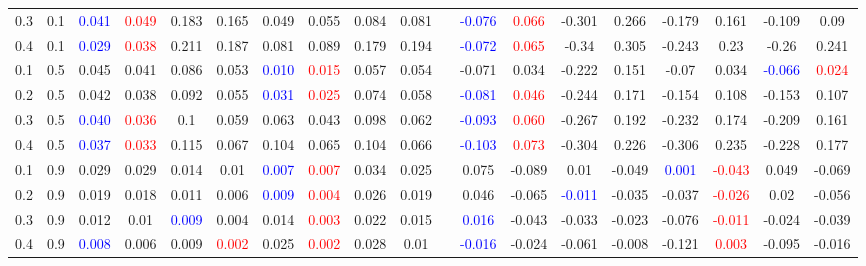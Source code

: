 \documentclass[specialist,
substylefile = spbu_report.rtx,
subf,href,colorlinks=true, 12pt]{disser}
\theoremstyle{definition}
\begin{document}
\begin{table}
{\begin{tabular}{m{1cm}m{1cm}ccccccccm{0.2cm}cccccccc}
			0.3 & 0.1 & \textcolor{blue}{0.041} & \textcolor{red}{0.049} & 0.183 & 0.165 & 0.049 & 0.055 & 0.084 & 0.081 & & \textcolor{blue}{-0.076} & \textcolor{red}{0.066} & -0.301 & 0.266 & -0.179 & 0.161 & -0.109 & 0.09 \\ 
			0.4 & 0.1 & \textcolor{blue}{0.029} & \textcolor{red}{0.038} & 0.211 & 0.187 & 0.081 & 0.089 & 0.179 & 0.194 & & \textcolor{blue}{-0.072} & \textcolor{red}{0.065} & -0.34 & 0.305 & -0.243 & 0.23 & -0.26 & 0.241 \\ 
			\hline
			0.1 & 0.5 & 0.045 & 0.041 & 0.086 & 0.053 & \textcolor{blue}{0.010} & \textcolor{red}{0.015} & 0.057 & 0.054 & & -0.071 & 0.034 & -0.222 & 0.151 & -0.07 & 0.034 & \textcolor{blue}{-0.066} & \textcolor{red}{0.024} \\ 
			0.2 & 0.5 & 0.042 & 0.038 & 0.092 & 0.055 & \textcolor{blue}{0.031} & \textcolor{red}{0.025} & 0.074 & 0.058 & & \textcolor{blue}{-0.081} & \textcolor{red}{0.046} & -0.244 & 0.171 & -0.154 & 0.108 & -0.153 & 0.107 \\ 
			0.3 & 0.5 & \textcolor{blue}{0.040} & \textcolor{red}{0.036} & 0.1 & 0.059 & 0.063 & 0.043 & 0.098 & 0.062 & & \textcolor{blue}{-0.093} & \textcolor{red}{0.060} & -0.267 & 0.192 & -0.232 & 0.174 & -0.209 & 0.161 \\ 
			0.4 & 0.5 & \textcolor{blue}{0.037} & \textcolor{red}{0.033} & 0.115 & 0.067 & 0.104 & 0.065 & 0.104 & 0.066 & & \textcolor{blue}{-0.103} & \textcolor{red}{0.073} & -0.304 & 0.226 & -0.306 & 0.235 & -0.228 & 0.177 \\
			\hline
			0.1 & 0.9 & 0.029 & 0.029 & 0.014 & 0.01 & \textcolor{blue}{0.007} & \textcolor{red}{0.007} & 0.034 & 0.025 & & 0.075 & -0.089 & 0.01 & -0.049 & \textcolor{blue}{0.001} & \textcolor{red}{-0.043} & 0.049 & -0.069 \\ 
			0.2 & 0.9 & 0.019 & 0.018 & 0.011 & 0.006 & \textcolor{blue}{0.009} & \textcolor{red}{0.004} & 0.026 & 0.019 & & 0.046 & -0.065 & \textcolor{blue}{-0.011} & -0.035 & -0.037 & \textcolor{red}{-0.026} & 0.02 & -0.056 \\ 
			0.3 & 0.9 & 0.012 & 0.01 & \textcolor{blue}{0.009} & 0.004 & 0.014 & \textcolor{red}{0.003} & 0.022 & 0.015 & & \textcolor{blue}{0.016} & -0.043 & -0.033 & -0.023 & -0.076 & \textcolor{red}{-0.011} & -0.024 & -0.039 \\ 
			0.4 & 0.9 & \textcolor{blue}{0.008} & 0.006 & 0.009 & \textcolor{red}{0.002} & 0.025 & \textcolor{red}{0.002} & 0.028 & 0.01 & & \textcolor{blue}{-0.016} & -0.024 & -0.061 & -0.008 & -0.121 & \textcolor{red}{0.003} & -0.095 & -0.016 \\ \hline
		\end{tabular}
	}
\end{table}
\end{document}
